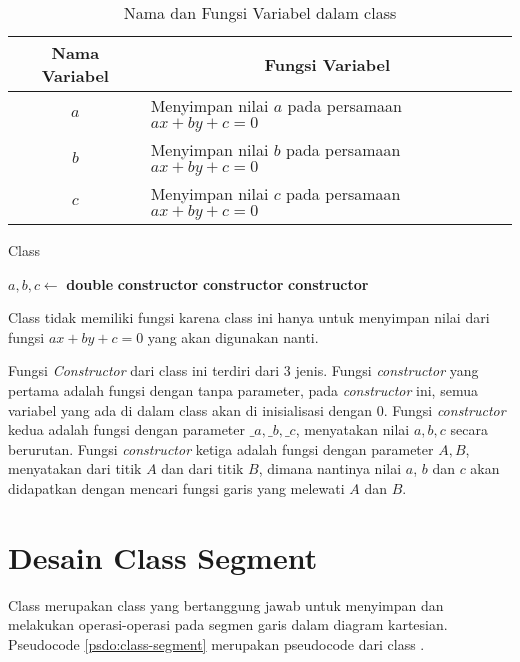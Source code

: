 \begin{table}[htb]
	\Centering
	\caption{Nama dan Fungsi Variabel dalam class }
	\begin{tabular}{|c|p{7cm}|}
	\hline
	Nama Variabel & \multicolumn{1}{c|}{Fungsi Variabel}                               \\ \hline
$a$           & Menyimpan nilai $a$ pada persamaan $ax + by + c =0$ \\ \hline
$b$           & Menyimpan nilai $b$ pada persamaan $ax + by + c =0$          \\ \hline
$c$           & Menyimpan nilai $c$ pada persamaan $ax + by + c =0$          \\ \hline
	\end{tabular}
	\label{tab:var-line}
\end{table}
\begin{algorithm}
	\caption{Class }
	\label{psdo:class-line}
	\begin{algorithmic}[1]
        \State $ a, b, c \leftarrow $ \textbf{double}
		\State \textbf{constructor} 
        \State \textbf{constructor} 
        \State \textbf{constructor} 
	\end{algorithmic}
\end{algorithm}

Class  tidak memiliki fungsi karena class ini hanya untuk menyimpan nilai dari fungsi $ax+by+c=0$ yang akan digunakan nanti.

Fungsi \textit{Constructor} dari class ini terdiri dari 3 jenis. Fungsi \textit{constructor} yang pertama adalah fungsi dengan tanpa parameter, pada \textit{constructor} ini, semua variabel yang ada di dalam class  akan di inisialisasi dengan $0$. Fungsi \textit{constructor} kedua adalah fungsi dengan parameter $\_a, \_b, \_c$, menyatakan nilai $a, b, c$ secara berurutan. Fungsi \textit{constructor} ketiga adalah fungsi dengan parameter $A, B$, menyatakan  dari titik $A$ dan  dari titik $B$, dimana nantinya nilai $a$, $b$ dan $c$ akan didapatkan dengan mencari fungsi garis yang melewati  $A$ dan  $B$.

\section{ Desain Class Segment}
\label{sec:segment}
Class  merupakan class yang bertanggung jawab untuk menyimpan dan melakukan operasi-operasi pada segmen garis dalam diagram kartesian. Pseudocode \ref{psdo:class-segment} merupakan pseudocode dari class . 

